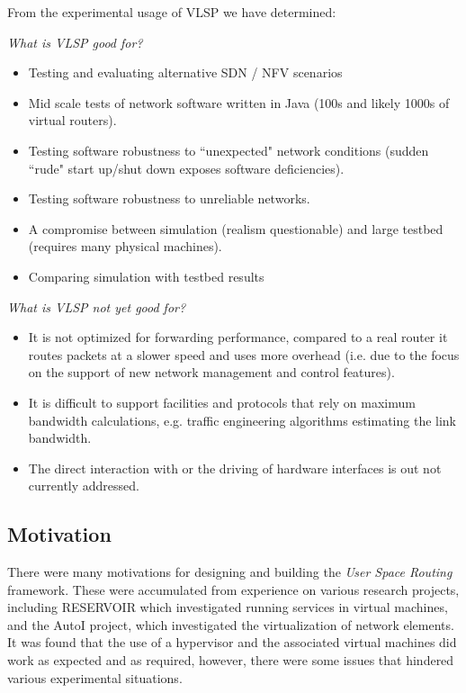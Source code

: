 \noindent From the experimental usage of VLSP we have determined:
\begin{description}[leftmargin=1em,labelindent=0,itemsep=3pt]
\item \textit{What is VLSP good for?}

\begin{itemize}
\item Testing and evaluating alternative SDN / NFV scenarios
\item Mid scale tests of network software written in Java (100s and likely 
1000s of virtual routers).
\item Testing software robustness to ``unexpected" network conditions
(sudden ``rude" start up/shut down exposes software deficiencies).
\item Testing software robustness to unreliable networks.
\item A compromise between simulation (realism questionable) and large
testbed (requires many physical machines).
\item Comparing simulation with testbed results
\end{itemize}

\item \textit{What is VLSP \emph{not} yet good for?}

\begin{itemize}
\item It is not optimized for forwarding performance, compared to a real router it routes packets at a slower speed and uses more overhead (i.e. due to the focus on the support of new network management and control features).
\item It is difficult to support facilities and protocols that rely on maximum bandwidth
  calculations, e.g. traffic engineering algorithms estimating
  the link bandwidth.
  \item The direct interaction with or the driving of hardware interfaces
  is out not currently addressed. %
\end{itemize}

\end{description}



\subsection{Motivation}

There were many motivations for designing and building the \emph{User Space Routing}
framework.  These were accumulated from experience on various research
projects, including RESERVOIR which investigated running services in virtual machines, and
the AutoI project, which investigated the virtualization of network
elements.
It was found that the use of a hypervisor and the associated virtual
machines did work as expected and as required, however, there were
some issues that hindered various experimental situations.

